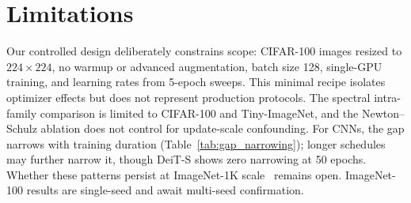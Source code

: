 \vspace{-0.5em}
\section*{Limitations}
\label{sec:limitations}
\vspace{-0.3em}
Our controlled design deliberately constrains scope: CIFAR-100 images resized to $224{\times}224$, no warmup or advanced augmentation, batch size 128, single-GPU training, and learning rates from 5-epoch sweeps. This minimal recipe isolates optimizer effects but does not represent production protocols. The spectral intra-family comparison is limited to CIFAR-100 and Tiny-ImageNet, and the Newton--Schulz ablation does not control for update-scale confounding. For CNNs, the gap narrows with training duration (Table~\ref{tab:gap_narrowing}); longer schedules may further narrow it, though DeiT-S shows zero narrowing at 50 epochs. Whether these patterns persist at ImageNet-1K scale~\cite{kumar2024how} remains open. ImageNet-100 results are single-seed and await multi-seed confirmation.
